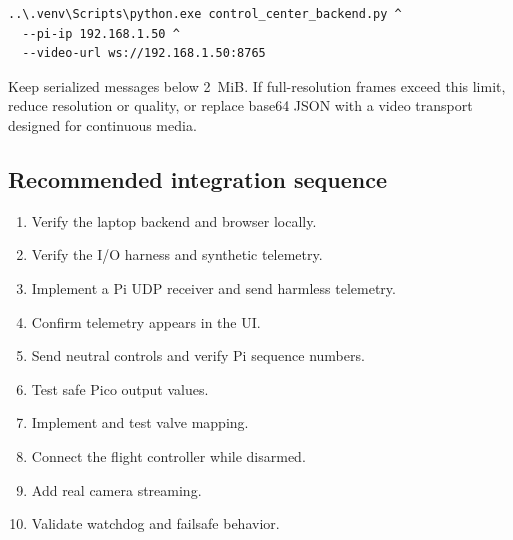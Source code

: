 \documentclass[11pt]{article}
\begin{document}
\begin{lstlisting}
..\.venv\Scripts\python.exe control_center_backend.py ^
  --pi-ip 192.168.1.50 ^
  --video-url ws://192.168.1.50:8765
\end{lstlisting}

Keep serialized messages below 2~MiB. If full-resolution frames exceed this
limit, reduce resolution or quality, or replace base64 JSON with a video
transport designed for continuous media.

\subsection{Recommended integration sequence}

\begin{enumerate}
\item Verify the laptop backend and browser locally.
\item Verify the I/O harness and synthetic telemetry.
\item Implement a Pi UDP receiver and send harmless telemetry.
\item Confirm telemetry appears in the UI.
\item Send neutral controls and verify Pi sequence numbers.
\item Test safe Pico output values.
\item Implement and test valve mapping.
\item Connect the flight controller while disarmed.
\item Add real camera streaming.
\item Validate watchdog and failsafe behavior.
\end{enumerate}
\end{document}
